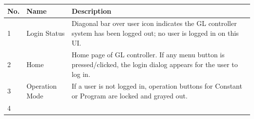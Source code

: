 \begin{longtable}[]{@{}lll@{}}
\toprule
\begin{minipage}[b]{0.04\columnwidth}\raggedright
No.\strut
\end{minipage} & \begin{minipage}[b]{0.23\columnwidth}\raggedright
Name\strut
\end{minipage} & \begin{minipage}[b]{0.65\columnwidth}\raggedright
Description\strut
\end{minipage}\tabularnewline
\midrule
\endhead
\begin{minipage}[t]{0.04\columnwidth}\raggedright
1\strut
\end{minipage} & \begin{minipage}[t]{0.23\columnwidth}\raggedright
Login Status\strut
\end{minipage} & \begin{minipage}[t]{0.65\columnwidth}\raggedright
Diagonal bar over user icon indicates the GL controller system has been
logged out; no user is logged in on this UI.\strut
\end{minipage}\tabularnewline
\begin{minipage}[t]{0.04\columnwidth}\raggedright
2\strut
\end{minipage} & \begin{minipage}[t]{0.23\columnwidth}\raggedright
Home\strut
\end{minipage} & \begin{minipage}[t]{0.65\columnwidth}\raggedright
Home page of GL controller. If any menu button is pressed/clicked, the
login dialog appears for the user to log in.\strut
\end{minipage}\tabularnewline
\begin{minipage}[t]{0.04\columnwidth}\raggedright
3\strut
\end{minipage} & \begin{minipage}[t]{0.23\columnwidth}\raggedright
Operation Mode\strut
\end{minipage} & \begin{minipage}[t]{0.65\columnwidth}\raggedright
If a user is not logged in, operation buttons for Constant or Program
are locked and grayed out.\strut
\end{minipage}\tabularnewline
\begin{minipage}[t]{0.04\columnwidth}\raggedright
4\strut
\end{minipage} & \begin{minipage}[t]{0.23\columnwidth}\raggedright

\end{minipage}
\end{longtable}
